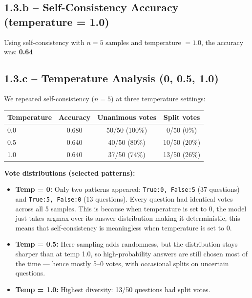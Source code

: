 \documentclass[11pt]{article}
\begin{document}
\newpage
\subsection*{1.3.b -- Self-Consistency Accuracy (temperature = 1.0)}

Using self-consistency with $n = 5$ samples and temperature $= 1.0$, the accuracy was: \textbf{0.64}

\subsection*{1.3.c -- Temperature Analysis (0, 0.5, 1.0)}

We repeated self-consistency ($n=5$) at three temperature settings:

\begin{center}
\begin{tabular}{lccc}
\toprule
\textbf{Temperature} & \textbf{Accuracy} & \textbf{Unanimous votes} & \textbf{Split votes} \\
\midrule
0.0  & 0.680 & 50/50 (100\%) & 0/50 (0\%) \\
0.5  & 0.640 & 40/50 (80\%)  & 10/50 (20\%) \\
1.0  & 0.640 & 37/50 (74\%)  & 13/50 (26\%) \\
\bottomrule
\end{tabular}
\end{center}

\textbf{Vote distributions (selected patterns):}
\begin{itemize}
    \item \textbf{Temp = 0:} Only two patterns appeared: \texttt{True:0, False:5} (37 questions) and \texttt{True:5, False:0} (13 questions). Every question had identical votes across all 5 samples. 
    This is because when temperature is set to 0, the model just takes argmax over its answer distribution making it deterministic, this means that self-consistency is meaningless when temperature is set to 0.
    
    \item \textbf{Temp = 0.5:} Here sampling adds randomness, but the distribution stays sharper than at temp 1.0, so high-probability answers are still chosen most of the time — hence mostly 5–0 votes, with occasional splits on uncertain questions.
    
    \item \textbf{Temp = 1.0:} Highest diversity: 13/50 questions had split votes.
\end{itemize}
\end{document}
